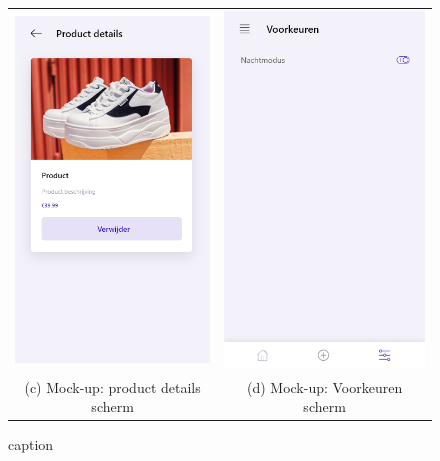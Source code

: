 \begin{figure}
\begin{tabular}{cc}
        \includegraphics[width=65mm]{img/methodologie/mock-details_screen.png} &   \includegraphics[width=65mm]{img/methodologie/mock-preferences.png} \\
        (c) Mock-up: product details scherm & (d) Mock-up: Voorkeuren scherm \\[6pt]
    \end{tabular}
    \caption{caption}
\end{figure}

